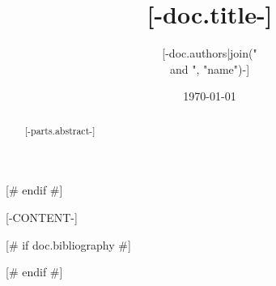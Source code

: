 \documentclass[11pt]{article}
\title{[-doc.title-]}
[# if doc.authors #]
\author{[-doc.authors|join(" \\and ", "name")-]}
[# endif #]
\date{\today}
\begin{document}
\begin{abstract}
[-parts.abstract-]
\end{abstract}
[# endif #]

[-CONTENT-]

[# if doc.bibliography #]

[# endif #]
\end{document}
